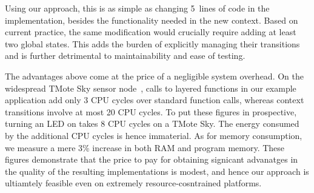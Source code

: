 Using our approach, this is as simple as changing 5~lines of code in
the \conesc implementation, besides the functionality needed in the
new  context.  Based on current practice, the same
modification would crucially require adding at least two global
states.  This adds the burden of explicitly managing their
transitions and is further detrimental to maintainability and ease
of testing.

 The advantages above come at the price
of a negligible system overhead. On the widespread TMote Sky sensor
node~\cite{polastre05telos}, calls to layered functions in our example
application add only 3 CPU cycles over standard function calls,
whereas context transitions involve at most 20 CPU cycles. To put
these figures in prospective, turning an LED on takes 8 CPU cycles on
a TMote Sky. The energy consumed by the additional CPU cycles is
hence immaterial. As for memory consumption, we measure a mere 3\%
increase in both RAM and program memory. These figures demonstrate
that the price to pay for obtaining signicant advanatges in the
quality of the resulting implementations is modest, and hence our
approach is ultiamtely feasible even on extremely resource-cosntrained
platforms.





